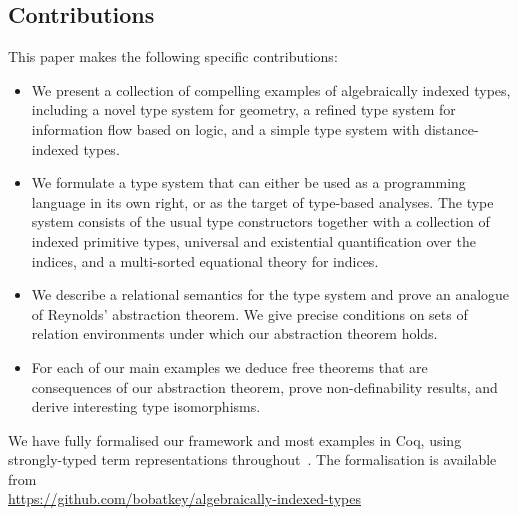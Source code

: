 
\subsection{Contributions}
\label{sec:contributions}

This paper makes the following specific contributions:
\begin{itemize}
\item 
We present a collection of compelling examples of algebraically
indexed types, including a novel type system for geometry, a
refined type system for information flow based on logic, and a simple
type system with distance-indexed types.
\item 
We formulate a type system that can either be used as a programming
language in its own right, or as the target of type-based
analyses. The type system consists of the usual type constructors
together with a collection of indexed primitive types, universal and
existential quantification over the indices, and a multi-sorted
equational theory for indices.
\item
We describe a relational semantics for the type system and prove an
analogue of Reynolds' abstraction theorem. We give precise conditions
on sets of relation environments under which our abstraction theorem
holds.
\item
For each of our main examples we deduce free theorems that are
consequences of our abstraction theorem, prove non-definability
results, and derive interesting type isomorphisms.
\end{itemize}
We have fully formalised our framework and most examples in Coq,
using strongly-typed term representations
throughout~\cite{TypedSyntax}. The formalisation is available from
\\{\small \url{https://github.com/bobatkey/algebraically-indexed-types}}



